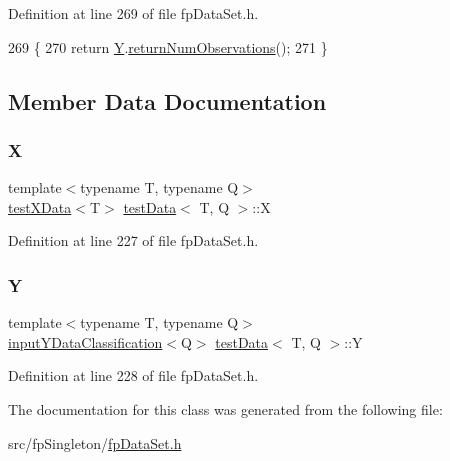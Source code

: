 Definition at line 269 of file fp\+Data\+Set.\+h.


\begin{DoxyCode}
269                                           \{
270             \textcolor{keywordflow}{return} \hyperlink{classtestData_a97961fe071062be1146fcbcb1aaf7a00}{Y}.\hyperlink{classinputYData_a93becb50dcb3b2d6dd3c488ae83b2c6b}{returnNumObservations}();
271         \}
\end{DoxyCode}


\subsection{Member Data Documentation}
\mbox{\label{classtestData_aaed20c168b252c39fb9dc56757315eee}} 
\subsubsection{\texorpdfstring{X}{X}}
{\footnotesize\ttfamily template$<$typename T, typename Q$>$ \\
\hyperlink{classtestXData}{test\+X\+Data}$<$T$>$ \hyperlink{classtestData}{test\+Data}$<$ T, Q $>$\+::X\hspace{0.3cm}{\ttfamily [private]}}



Definition at line 227 of file fp\+Data\+Set.\+h.

\mbox{\label{classtestData_a97961fe071062be1146fcbcb1aaf7a00}} 
\subsubsection{\texorpdfstring{Y}{Y}}
{\footnotesize\ttfamily template$<$typename T, typename Q$>$ \\
\hyperlink{classinputYDataClassification}{input\+Y\+Data\+Classification}$<$Q$>$ \hyperlink{classtestData}{test\+Data}$<$ T, Q $>$\+::Y\hspace{0.3cm}{\ttfamily [private]}}



Definition at line 228 of file fp\+Data\+Set.\+h.



The documentation for this class was generated from the following file\+:\begin{DoxyCompactItemize}
\item 
src/fp\+Singleton/\hyperlink{fpDataSet_8h}{fp\+Data\+Set.\+h}\end{DoxyCompactItemize}
